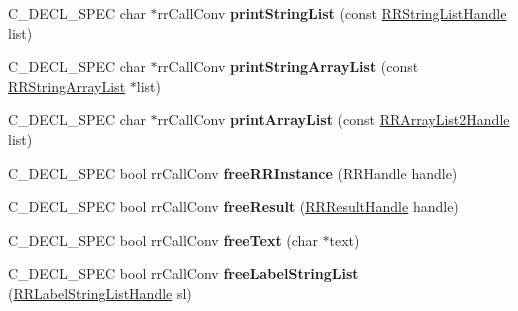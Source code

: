 \begin{DoxyCompactItemize}
\item 
\hypertarget{group__loadsave_ga344136d920ad8cafbb0a1801cf045c07}{
\-C\-\_\-\-D\-E\-C\-L\-\_\-\-S\-P\-E\-C char $\ast$rr\-Call\-Conv {\bfseries print\-String\-List} (const \hyperlink{rr__c__types_8h_abf561b014879247b7b92ee99c205de21}{\-R\-R\-String\-List\-Handle} list)}
\label{group__loadsave_ga344136d920ad8cafbb0a1801cf045c07}

\item 
\hypertarget{group__loadsave_ga6fe9d99e416f3a8791b0d80226a74099}{
\-C\-\_\-\-D\-E\-C\-L\-\_\-\-S\-P\-E\-C char $\ast$rr\-Call\-Conv {\bfseries print\-String\-Array\-List} (const \hyperlink{struct_r_r_string_array_list}{\-R\-R\-String\-Array\-List} $\ast$list)}
\label{group__loadsave_ga6fe9d99e416f3a8791b0d80226a74099}

\item 
\hypertarget{group__loadsave_ga01ee2cd3cf82cfd67149944282eafbb6}{
\-C\-\_\-\-D\-E\-C\-L\-\_\-\-S\-P\-E\-C char $\ast$rr\-Call\-Conv {\bfseries print\-Array\-List} (const \hyperlink{rr__c__types_8h_a21a10f01ac4fd34c61e7e7d12af9891d}{\-R\-R\-Array\-List2\-Handle} list)}
\label{group__loadsave_ga01ee2cd3cf82cfd67149944282eafbb6}

\item 
\hypertarget{group__loadsave_ga59ccea13a522b2ce61220cff4ea761c2}{
\-C\-\_\-\-D\-E\-C\-L\-\_\-\-S\-P\-E\-C bool rr\-Call\-Conv {\bfseries free\-R\-R\-Instance} (\-R\-R\-Handle handle)}
\label{group__loadsave_ga59ccea13a522b2ce61220cff4ea761c2}

\item 
\hypertarget{group__loadsave_ga7a1fb56bd09bb535af7b6f3bc51c89b5}{
\-C\-\_\-\-D\-E\-C\-L\-\_\-\-S\-P\-E\-C bool rr\-Call\-Conv {\bfseries free\-Result} (\hyperlink{rr__c__types_8h_a8c364bbdef9aab31c89655c38461da51}{\-R\-R\-Result\-Handle} handle)}
\label{group__loadsave_ga7a1fb56bd09bb535af7b6f3bc51c89b5}

\item 
\hypertarget{group__loadsave_ga1001b1dab86472f6db5bcbe724c41631}{
\-C\-\_\-\-D\-E\-C\-L\-\_\-\-S\-P\-E\-C bool rr\-Call\-Conv {\bfseries free\-Text} (char $\ast$text)}
\label{group__loadsave_ga1001b1dab86472f6db5bcbe724c41631}

\item 
\hypertarget{group__loadsave_gadca4757725ec2e3d8251a001fde8028b}{
\-C\-\_\-\-D\-E\-C\-L\-\_\-\-S\-P\-E\-C bool rr\-Call\-Conv {\bfseries free\-Label\-String\-List} (\hyperlink{struct_r_r_label_string_list}{\-R\-R\-Label\-String\-List\-Handle} sl)}
\label{group__loadsave_gadca4757725ec2e3d8251a001fde8028b}


\end{DoxyCompactItemize}
